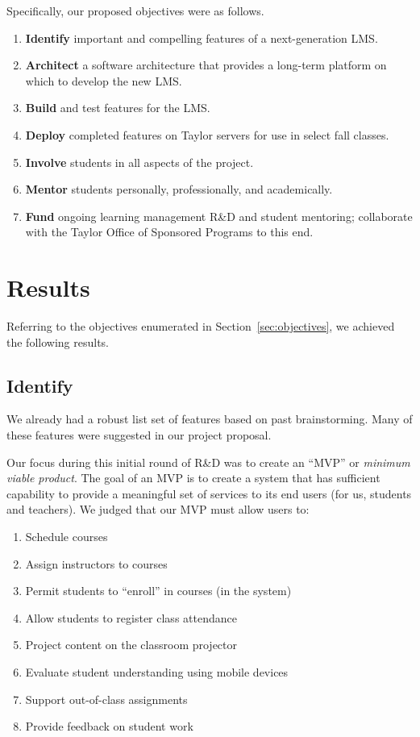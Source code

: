 \documentclass{article}
\begin{document}
Specifically, our proposed objectives
were as follows.
\begin{enumerate}
\item \textbf{Identify}
  important and compelling features of
  a next-generation LMS.
\item \textbf{Architect}
  a software architecture
  that provides a long-term platform
  on which to develop the new LMS.
\item \textbf{Build}
  and test features for the LMS.
\item \textbf{Deploy}
  completed features
  on Taylor servers
  for use in select fall classes.
\item \textbf{Involve}
  students in all aspects of the project.
\item \textbf{Mentor}
  students personally, professionally,
  and academically.
\item \textbf{Fund}
  ongoing learning management R\&D and student mentoring;
  collaborate with the Taylor Office of Sponsored Programs
  to this end.
\end{enumerate}

\section{Results}
\label{sec:results}

Referring to the objectives enumerated in Section~\ref{sec:objectives},
we achieved the following results.

\subsection{Identify}
\label{sec:identify}

We already had a robust list set of features
based on past brainstorming.
Many of these features were suggested in our project proposal.

Our focus during this initial round of R\&D
was to create an ``MVP'' or \emph{minimum viable product}.
The goal of an MVP is to create a system
that has sufficient capability
to provide a meaningful set of services
to its end users (for us, students and teachers).
We judged that our MVP
must allow users to:
\begin{enumerate}
\item Schedule courses
\item Assign instructors to courses
\item Permit students to ``enroll'' in courses (in the system)
\item Allow students to register class attendance
\item Project content on the classroom projector
\item Evaluate student understanding using mobile devices
\item Support out-of-class assignments
\item Provide feedback on student work
\end{enumerate}
\end{document}
